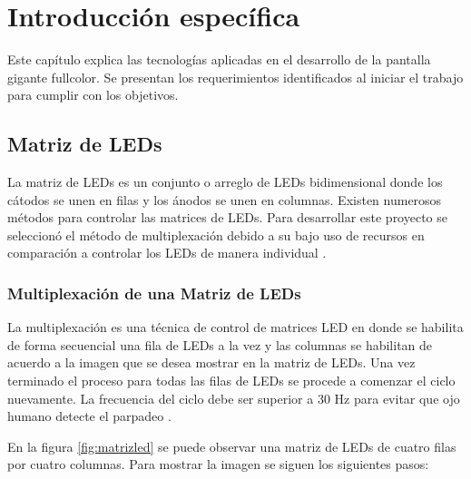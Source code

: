 \chapter{Introducción específica} %

\label{Chapter2}

Este capítulo explica las tecnologías aplicadas en el desarrollo de la pantalla gigante fullcolor. Se presentan los requerimientos identificados al iniciar el trabajo para cumplir con los objetivos.
\section{Matriz de LEDs}
La matriz de LEDs es un conjunto o arreglo de LEDs  bidimensional donde los cátodos se unen en filas y los ánodos se unen en columnas. Existen numerosos métodos para controlar las matrices de LEDs. Para desarrollar este proyecto se seleccionó el método de multiplexación debido a su bajo uso de recursos en comparación a controlar los LEDs de manera individual \citep{CONCEPTOMATRIZ}.
\subsection{Multiplexación de una Matriz de LEDs }
La multiplexación es una técnica de control de matrices LED en donde se habilita de forma secuencial una fila de LEDs a la vez y las columnas se habilitan de acuerdo a la imagen que se desea mostrar en la matriz de LEDs. Una vez terminado el proceso para todas las filas de LEDs se procede a comenzar el ciclo nuevamente. La frecuencia del ciclo debe ser superior a 30 Hz para evitar que ojo humano detecte el parpadeo \citep{MULTIPLEXADO}.

En la figura \ref{fig:matrizled} se puede observar una matriz de LEDs de cuatro filas por cuatro columnas. Para mostrar la imagen se siguen los siguientes pasos:

